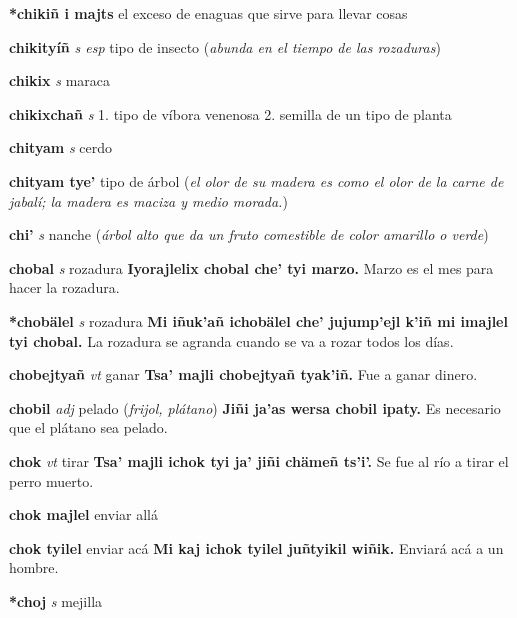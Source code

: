 \documentclass[10pt]{scrbook}
\newcommand{\entry}[1]{\textbf{#1}}
\newcommand{\onedefinition}[1]{#1.}
\newcommand{\partofspeech}[1]{\textit{#1}}
\newcommand{\spanishtranslation}[1]{#1}
\newcommand{\clarification}[1]{(\textit{#1})}
\newcommand{\cholexample}[1]{\textbf{#1}}
\newcommand{\exampletranslation}[1]{#1}
\begin{document}
\begin{multicols}{2}
\entry{*chikiñ i majts}
\spanishtranslation{el exceso de enaguas que sirve para llevar cosas}

\entry{chikityíñ}
\partofspeech{s esp}
\spanishtranslation{tipo de insecto}
\clarification{abunda en el tiempo de las rozaduras}

\entry{chikix}
\partofspeech{s}
\spanishtranslation{maraca}

\entry{chikixchañ}
\partofspeech{s}
\onedefinition{1}
\spanishtranslation{tipo de víbora venenosa}
\onedefinition{2}
\spanishtranslation{semilla de un tipo de planta}

\entry{chityam}
\partofspeech{s}
\spanishtranslation{cerdo}

\entry{chityam tye'}
\spanishtranslation{tipo de árbol}
\clarification{el olor de su madera es como el olor de la carne de jabalí; la madera es maciza y medio morada.}

\entry{chi'}
\partofspeech{s}
\spanishtranslation{nanche}
\clarification{árbol alto que da un fruto comestible de color amarillo o verde}

\entry{chobal}
\partofspeech{s}
\spanishtranslation{rozadura}
\cholexample{Iyorajlelix chobal che' tyi marzo.}
\exampletranslation{Marzo es el mes para hacer la rozadura.}

\entry{*chobälel}
\partofspeech{s}
\spanishtranslation{rozadura}
\cholexample{Mi iñuk'añ ichobälel che' jujump'ejl k'iñ mi imajlel tyi chobal.}
\exampletranslation{La rozadura se agranda cuando se va a rozar todos los días.}

\entry{chobejtyañ}
\partofspeech{vt}
\spanishtranslation{ganar}
\cholexample{Tsa' majli chobejtyañ tyak'iñ.}
\exampletranslation{Fue a ganar dinero.}

\entry{chobil}
\partofspeech{adj}
\spanishtranslation{pelado}
\clarification{frijol, plátano}
\cholexample{Jiñi ja'as wersa chobil ipaty.}
\exampletranslation{Es necesario que el plátano sea pelado.}

\entry{chok}
\partofspeech{vt}
\spanishtranslation{tirar}
\cholexample{Tsa' majli ichok tyi ja' jiñi chämeñ ts'i'.}
\exampletranslation{Se fue al río a tirar el perro muerto.}

\entry{chok majlel}
\spanishtranslation{enviar allá}

\entry{chok tyilel}
\spanishtranslation{enviar acá}
\cholexample{Mi kaj ichok tyilel juñtyikil wiñik.}
\exampletranslation{Enviará acá a un hombre.}

\entry{*choj}
\partofspeech{s}
\spanishtranslation{mejilla}


\end{multicols}
\end{document}
